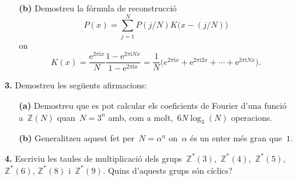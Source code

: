 \documentclass[a4paper]{article}
\theoremstyle{plain}
\theoremstyle{definition}
\newcommand{\iu}{\mathrm{i}}
\newcommand{\e}{\mathrm{e}}
\providecommand{\uppi}{\pi}
\newcommand{\ZZ}{\mathbb{Z}}
\begin{document}
\begin{enumerate}
    \item[]\begin{enumerate}
            \item[\textbf{(b)}] Demostreu la fórmula de reconstrucció
                \[
                    P(x)
                    =
                    \sum_{j=1}^{N}
                    P(j/N)
                    K\bigl(x-(j/N)\bigr)
                \]
                on
                \[
                    K(x)
                    =
                    \frac{\e^{2\uppi\iu x}}{N}
                    \frac{1-\e^{2\uppi\iu Nx}}{1-\e^{2\uppi\iu x}}
                    =
                    \frac{1}{N}
                    \bigl(
                        e^{2\uppi\iu x}
                        +
                        \e^{2\uppi\iu2x}
                        + \cdots +
                        \e^{2\uppi\iu Nx}
                    \bigr).
                \]
        \end{enumerate}
\end{enumerate}

\begin{enumerate}
    \item[\textbf{3.}] Demostreu les següents afirmacions:
        \begin{enumerate}
            \item[\textbf{(a)}] Demostreu que es pot calcular els coeficients de
                Fourier d'una funció a~\(\ZZ(N)\) quan~\(N=3^{n}\) amb, com a
                molt,~\(6N\log_{3}(N)\) operacions.
        \end{enumerate}
\end{enumerate}

\begin{enumerate}
    \item[]\begin{enumerate}
        \item[\textbf{(b)}] Generalitzeu aquest fet per~\(N=\alpha^{n}\)
            on~\(\alpha\) és un enter més gran que~\(1\).
    \end{enumerate}
\end{enumerate}

\begin{enumerate}
    \item[\textbf{4.}] Escriviu les taules de multiplicació dels
        grups~\(\ZZ^{\ast}(3)\),~\(\ZZ^{\ast}(4)\),~\(\ZZ^{\ast}(5)\),~\(\ZZ^{\ast}(6)\),
        \(\ZZ^{\ast}(8)\) i~\(\ZZ^{\ast}(9)\).
        Quins d'aquests grups són cíclics?
\end{enumerate}
\end{document}
